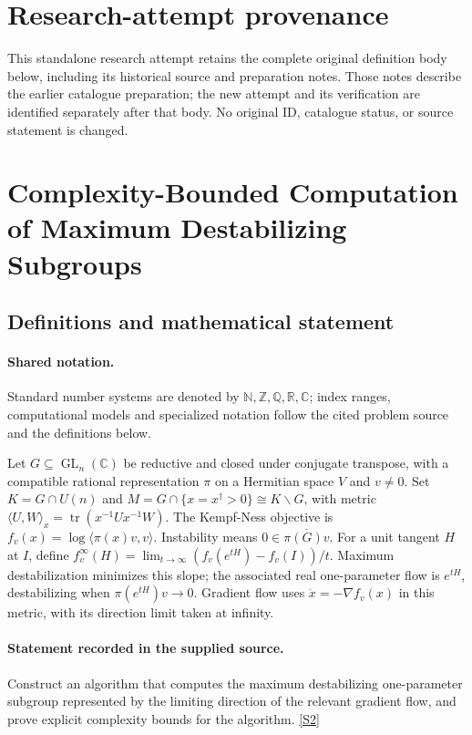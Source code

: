 \documentclass[11pt]{article}
\begin{document}
\section*{Research-attempt provenance}
This standalone research attempt retains the complete original definition body below,
including its historical source and preparation notes. Those notes describe the
earlier catalogue preparation; the new attempt and its verification are identified
separately after that body. No original ID, catalogue status, or source statement is changed.

\section{Complexity-Bounded Computation of Maximum Destabilizing Subgroups}\label{statement}

\subsection{Definitions and mathematical statement}

\paragraph{Shared notation.}Standard number systems are denoted by $\mathbb N,\mathbb Z,\mathbb Q,\mathbb R,\mathbb C$; index ranges, computational models and specialized notation follow the cited problem source and the definitions below.


Let $G\subseteq\operatorname{GL}_n(\mathbb C)$ be reductive and closed under conjugate transpose, with a compatible rational representation $\pi$ on a Hermitian space $V$ and $v\ne0$. Set $K=G\cap U(n)$ and $M=G\cap\{x=x^\dagger>0\}\cong K\backslash G$, with metric $\langle U,W\rangle_x=\operatorname{tr}(x^{-1}Ux^{-1}W)$. The Kempf-Ness objective is $f_v(x)=\log\langle\pi(x)v,v\rangle$. Instability means $0\in\overline{\pi(G)v}$. For a unit tangent $H$ at $I$, define $f_v^\infty(H)=\lim_{t\to\infty}(f_v(e^{tH})-f_v(I))/t$. Maximum destabilization minimizes this slope; the associated real one-parameter flow is $e^{tH}$, destabilizing when $\pi(e^{tH})v\to0$. Gradient flow uses $\dot x=-\nabla f_v(x)$ in this metric, with its direction limit taken at infinity.
\paragraph{Statement recorded in the supplied source.}
Construct an algorithm that computes the maximum destabilizing one-parameter subgroup represented by the limiting direction of the relevant gradient flow, and prove explicit complexity bounds for the algorithm. \href{https://doi.org/10.4171/owr/2025/9}{[S2]}
\end{document}
